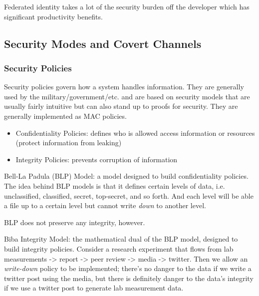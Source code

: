 \documentclass[../notes.tex]{subfiles}
\begin{document}
Federated identity takes a lot of the security burden off the developer which has significant productivity benefits.





\subsection{Security Modes and Covert Channels}



\subsubsection{Security Policies}
Security policies govern how a system handles information. They are generally used by the military/government/etc. and are based on security models that are usually fairly intuitive but can also stand up to proofs for security. They are generally implemented as MAC policies.


\begin{itemize}
    \item Confidentiality Policies: defines who is allowed access information or resources (protect information from leaking)
    \item Integrity Policies: prevents corruption of information
\end{itemize}


\begin{definition}
    Bell-La Padula (BLP) Model: a model designed to build confidentiality policies.
    The idea behind BLP models is that it defines certain levels of data, i.e. unclassified, classified, secret, top-secret, and so forth.
    And each level will be able a file up to a certain level but cannot write \textit{down} to another level.

\end{definition}

BLP does not preserve any integrity, however.

\begin{definition}
    Biba Integrity Model: the mathematical dual of the BLP model, designed to build integrity policies.
    Consider a research experiment that flows from lab measurements -> report -> peer review -> media -> twitter. Then we allow an \textit{write-down} policy to be implemented; there's no danger to the data if we write a twitter post using the media, but there is definitely danger to the data's integrity if we use a twitter post to generate lab measurement data.
\end{definition}
\end{document}
